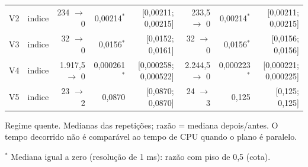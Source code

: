 {\begin{tabular}{llrrrrrr}
V2 & indice & 234 $\to$ 0 & 0,00214$^{*}$ & [0,00211; 0,00215] & 233,5 $\to$ 0 & 0,00214$^{*}$ & [0,00211; 0,00215] \\
V3 & indice & 32 $\to$ 0 & 0,0156$^{*}$ & [0,0152; 0,0161] & 32 $\to$ 0 & 0,0156$^{*}$ & [0,0156; 0,0156] \\
V4 & indice & 1.917,5 $\to$ 0 & 0,000261$^{*}$ & [0,000258; 0,000522] & 2.244,5 $\to$ 0 & 0,000223$^{*}$ & [0,000221; 0,000225] \\
V5 & indice & 23 $\to$ 2 & 0,0870 & [0,0870; 0,0870] & 24 $\to$ 3 & 0,125 & [0,125; 0,125] \\
\bottomrule
\end{tabular}\par
\vspace{3pt}
\begin{minipage}{\linewidth}\footnotesize
Regime quente. Medianas das repetições; razão = mediana depois/antes. O tempo decorrido não é comparável ao tempo de CPU quando o plano é paralelo.\par
$^{*}$ Mediana igual a zero (resolução de 1 ms): razão com piso de 0,5 (cota).
\end{minipage}
}
